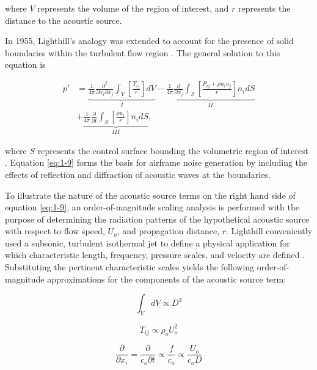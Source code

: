 where $V$ represents the volume of the region of interest, and $r$ represents the distance to the acoustic source.

In 1955, Lighthill's analogy was extended to account for the presence of solid boundaries within the turbulent flow region \cite{curle1955}.  The general solution to this equation is 

\begin{equation} \label{eq:1-9}
\begin{aligned}
p' &= \underbrace{ \frac{1}{4\pi} \frac{\partial^2}{\partial x_i \partial x_j} \int_V \left[ \frac{T_{ij}}{r} \right] dV }_I - \underbrace{ \frac{1}{4\pi} \frac{\partial}{\partial x_j} \int_S \left[ \frac{P_{ij} + \rho u_i u_j}{r} \right] n_i dS }_{II} \\
&+ \underbrace{ \frac{1}{4\pi} \frac{\partial}{\partial t} \int_S \left[ \frac{\rho u_i}{r} \right] n_i dS}_{III},
\end{aligned}
\end{equation}

where $S$ represents the control surface bounding the volumetric region of interest \cite{hirschberg2004}. Equation \ref{eq:1-9} forms the basis for airframe noise generation by including the effects of reflection and diffraction of acoustic waves at the boundaries.

To illustrate the nature of the acoustic source terms on the right hand side of equation \ref{eq:1-9}, an order-of-magnitude scaling analysis is performed with the purpose of determining the radiation patterns of the hypothetical acoustic source with respect to flow speed, $U_o$, and propagation distance, $r$. Lighthill conveniently used a subsonic, turbulent isothermal jet to define a physical application for which characteristic length, frequency, pressure scales, and velocity are defined \cite{lighthill1954}. Substituting the pertinent characteristic scales yields the following order-of-magnitude approximations for the components of the acoustic source term:

\begin{equation} \label{eq:D}
\int_{V} dV \propto D^3
\end{equation}

\begin{equation} \label{eq:U}
T_{ij} \propto \rho_o U_o^2
\end{equation}

\begin{equation} \label{eq:dx}
\frac{\partial}{\partial x_i} = \frac{\partial}{c_o \partial t} \propto \frac{f}{c_o} \propto \frac{U_o}{c_o D}
\end{equation}

